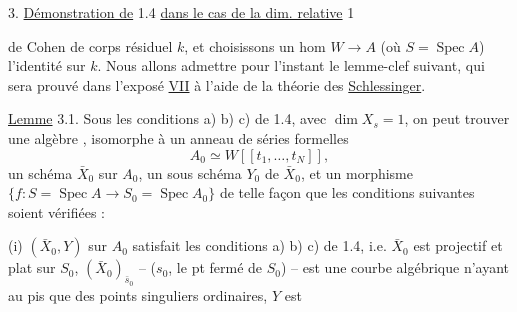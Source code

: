 3. \uline{Démonstration de} 1.4 \uline{dans le cas de la dim. relative} 1

  de Cohen de corps résiduel $k$, et choisissons un hom $W\to A$ (où $S=\operatorname{Spec}A$)   l'identité sur $k$.
Nous allons admettre pour l'instant le lemme-clef suivant, qui sera prouvé dans  l'exposé \uline{VII}  à l'aide de la théorie des  \uline{Schlessinger}.

\uline{Lemme} 3.1. Sous les conditions a) b) c) de 1.4, avec $\dim X_s=1$, on peut trouver une algèbre  , isomorphe à un anneau de séries formelles
\[
A_0\simeq W[[t_1,\ldots,t_N]],
\]
 un schéma $\bar X_0$ sur $A_0$, un sous schéma $Y_0$ de $\bar X_0$, et un morphisme $\{f:S=\operatorname{Spec}A\longrightarrow S_0=\operatorname{Spec}A_0\}$ de telle façon que les conditions suivantes soient vérifiées :

(i) $(\bar X_0,Y)$ sur $A_0$ satisfait les conditions a) b) c) de 1.4, i.e. $\bar X_0$ est projectif et plat sur $S_0$, $(\bar X_0)_{\bar s_0}$ -- ($s_0$, le pt fermé de $S_0$) -- est une courbe  algébrique  n'ayant au pis que des points singuliers ordinaires, $Y$ est    

